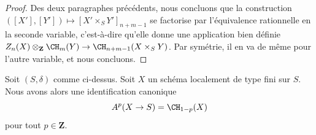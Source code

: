 \begin{proof}
\medskip\noindent
Des deux paragraphes précédents, nous concluons que
la construction $([X'], [Y']) \mapsto [X' \times_S Y']_{n + m - 1}$
se factorise par l'équivalence rationnelle en la seconde variable, c'est-à-dire
qu'elle donne une application bien définie
$Z_n(X) \otimes_{\mathbf{Z}} \CH_m(Y) \to \CH_{n + m - 1}(X \times_S Y)$.
Par symétrie, il en va de même pour l'autre variable, et nous concluons.
\end{proof}

\begin{lemma}
\label{lemma-chow-cohomology-towards-base-dim-1}
Soit $(S, \delta)$ comme ci-dessus. Soit $X$ un schéma localement de type fini
sur $S$. Nous avons alors une identification canonique
$$
A^p(X \to S) = \CH_{1 - p}(X)
$$
pour tout $p \in \mathbf{Z}$.
\end{lemma}

